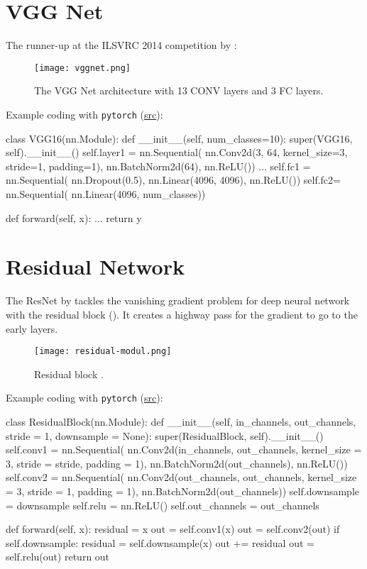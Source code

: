 \section{VGG Net}
The runner-up at the ILSVRC 2014 competition by :

\begin{figure}[hbt!]
	\centering
	\texttt{[image: vggnet.png]}
	\caption{The VGG Net architecture with 13 \ac{CONV} layers and 3 \ac{FC} layers. \cite{simonyan2014very}}
\end{figure}

Example coding with \texttt{pytorch} (\href{https://blog.paperspace.com/vgg-from-scratch-pytorch/}{src}):
\begin{python}
	class VGG16(nn.Module):
	def __init__(self, num_classes=10):
	super(VGG16, self).__init__()
	self.layer1 = nn.Sequential(
	nn.Conv2d(3, 64, kernel_size=3, stride=1, padding=1),
	nn.BatchNorm2d(64),
	nn.ReLU())
	...
	self.fc1 = nn.Sequential(
	nn.Dropout(0.5),
	nn.Linear(4096, 4096),
	nn.ReLU())
	self.fc2= nn.Sequential(
	nn.Linear(4096, num_classes))
	
	def forward(self, x):
	...
	return y
\end{python}

\section{Residual Network}
The \ac{ResNet} by  tackles the vanishing gradient problem for deep neural network with the residual block (). It creates a highway pass for the gradient to go to the early layers.
\begin{figure}[hbt!]
	\centering
	\texttt{[image: residual-modul.png]}
	\caption{Residual block \cite{he2016deep}.}
	\label{fig:residual-modul}
\end{figure}

Example coding with \texttt{pytorch} (\href{https://blog.paperspace.com/writing-resnet-from-scratch-in-pytorch/}{src}):
\begin{python}
class ResidualBlock(nn.Module):
	def __init__(self, in_channels, out_channels,
			stride = 1, downsample = None):
		super(ResidualBlock, self).__init__()
		self.conv1 = nn.Sequential(
		nn.Conv2d(in_channels, out_channels, kernel_size = 3,
		stride = stride, padding = 1),
		nn.BatchNorm2d(out_channels),
		nn.ReLU())
		self.conv2 = nn.Sequential(
		nn.Conv2d(out_channels, out_channels, kernel_size = 3,
		stride = 1, padding = 1),
		nn.BatchNorm2d(out_channels))
		self.downsample = downsample
		self.relu = nn.ReLU()
		self.out_channels = out_channels
	
	def forward(self, x):
		residual = x
		out = self.conv1(x)
		out = self.conv2(out)
		if self.downsample:
			residual = self.downsample(x)
		out += residual
		out = self.relu(out)
		return out
\end{python}

